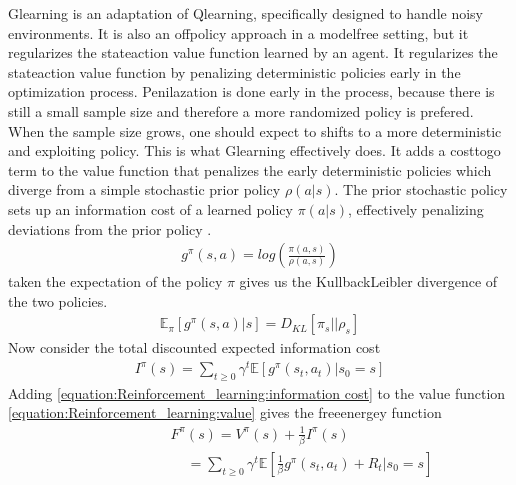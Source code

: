 \documentclass[letterpaper,10pt,english]{jupyterBook}
\begin{document}
\sphinxAtStartPar
G\sphinxhyphen{}learning is an adaptation of Q\sphinxhyphen{}learning, specifically designed to handle noisy environments. It is also an off\sphinxhyphen{}policy approach in a model\sphinxhyphen{}free setting, but it regularizes the state\sphinxhyphen{}action value function learned by an agent. It regularizes the state\sphinxhyphen{}action value function by penalizing deterministic policies early in the optimization process. Penilazation is done early in the process, because there is still a small sample size and therefore a more randomized policy is prefered. When the sample size grows, one should expect to shifts to a more deterministic and exploiting policy. This is what G\sphinxhyphen{}learning effectively does. It adds a cost\sphinxhyphen{}to\sphinxhyphen{}go term to the value function that penalizes the early deterministic policies which diverge from a simple stochastic prior policy \(\rho(a|s)\). The prior stochastic policy sets up an information cost of a learned policy \(\pi(a|s)\), effectively penalizing deviations from the prior policy .
\begin{equation*}
\begin{split} g^{\pi}(s,a) = log(\frac{\pi(a,s)}{\rho(a,s)}) \end{split}
\end{equation*}
\sphinxAtStartPar
taken the expectation of the policy \(\pi\) gives us the Kullback\sphinxhyphen{}Leibler divergence of the two policies.
\begin{equation*}
\begin{split} \mathbb{E}_{\pi}[g^{\pi}(s,a)|s] = D_{KL}[\pi_s || \rho_s] \end{split}
\end{equation*}
\sphinxAtStartPar
Now consider the total discounted expected information cost
\begin{equation}\label{equation:Reinforcement_learning:information cost}
\begin{split}I^{\pi}(s) = \sum_{t\geq0} \gamma^t \mathbb{E}[g^{\pi}(s_t,a_t)|s_0=s]\end{split}
\end{equation}
\sphinxAtStartPar
Adding \eqref{equation:Reinforcement_learning:information cost} to the value function \eqref{equation:Reinforcement_learning:value} gives the free\sphinxhyphen{}energey function
\begin{equation*}
\begin{split}F^{\pi}(s)= V^{\pi}(s) + \frac{1}{\beta} I^{\pi}(s)\end{split}
\end{equation*}\begin{equation}\label{equation:Reinforcement_learning:free-energy}
\begin{split}\hspace{3cm} = \sum_{t\geq 0 } \gamma^t \mathbb{E}[\frac{1}{\beta} g^{\pi}(s_t,a_t) + R_t|s_0=s] \end{split}
\end{equation}
\end{document}
